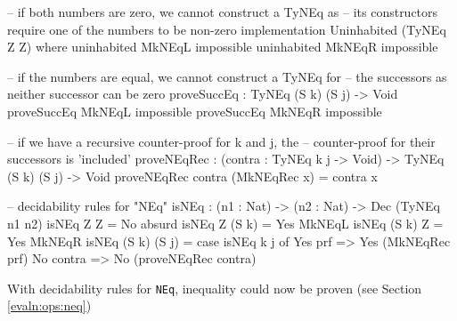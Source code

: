     \begin{code}[caption={Decidability rules for inequality}]
    -- if both numbers are zero, we cannot construct a TyNEq as
    -- its constructors require one of the numbers to be non-zero
    implementation Uninhabited (TyNEq Z Z) where
        uninhabited MkNEqL impossible
        uninhabited MkNEqR impossible

    -- if the numbers are equal, we cannot construct a TyNEq for      
    -- the successors as neither successor can be zero
    proveSuccEq : TyNEq (S k) (S j) -> Void
    proveSuccEq MkNEqL impossible
    proveSuccEq MkNEqR impossible
    
    -- if we have a recursive counter-proof for k and j, the
    -- counter-proof for their successors is 'included'
    proveNEqRec : (contra : TyNEq k j -> Void) ->
                  TyNEq (S k) (S j) -> Void
    proveNEqRec contra (MkNEqRec x) = contra x
    
    -- decidability rules for "NEq"
    isNEq : (n1 : Nat) -> (n2 : Nat) -> Dec (TyNEq n1 n2)
    isNEq Z Z         = No absurd
    isNEq Z (S k)     = Yes MkNEqL
    isNEq (S k) Z     = Yes MkNEqR
    isNEq (S k) (S j) = case isNEq k j of
                            Yes prf => Yes (MkNEqRec prf)
                            No contra => No (proveNEqRec contra)
    \end{code}
    
    With decidability rules for \texttt{NEq}, inequality could now be proven (see Section \ref{evaln:ops:neq})
    

